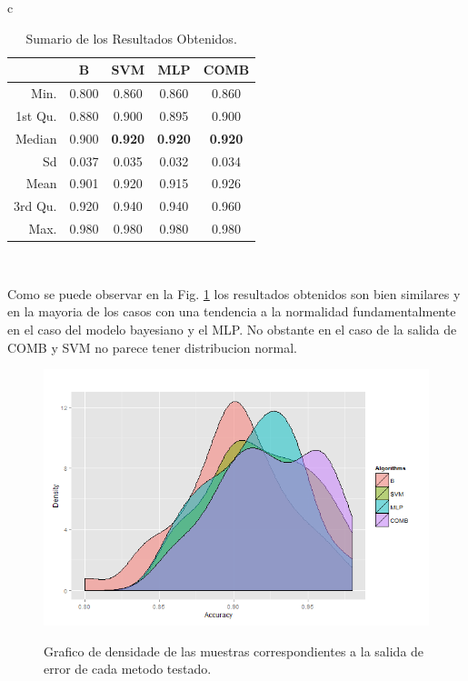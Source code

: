 \documentclass[12pt]{article}
\begin{document}
 
\begin{table}[!h]
\renewcommand{\arraystretch}{1.3}
\caption{Sumario de los Resultados Obtenidos. }
\label{tab:analisis_data}
\centering
\begin{tabular}{c}
\begin{tabular}{rcccc}
\hline
         &B   &     SVM  &  MLP   &  COMB     \\
\hline     
 Min.    &0.800   &0.860   &0.860   &0.860\\  
 1st Qu. &0.880   &0.900   &0.895   &0.900\\  
 Median  &0.900   &\textbf{0.920}   &\textbf{0.920}   &\textbf{0.920}\\  
 Sd      &0.037   &0.035   &0.032   &0.034\\
 Mean    &0.901   &0.920   &0.915   &0.926\\  
 3rd Qu. &0.920   &0.940   &0.940   &0.960\\  
 Max.    &0.980   &0.980   &0.980   &0.980\\  
\hline 
\end{tabular}\\
\end{tabular}
\end{table} 
 
Como se puede observar en la Fig. \ref{fig:densidade_acc} los resultados obtenidos son bien similares y en la mayoria de los casos con una tendencia a la normalidad fundamentalmente en el caso del modelo bayesiano y el MLP. No obstante en el caso de la salida de COMB y SVM no parece tener distribucion normal. 

\begin{figure}[h]
\centering
\includegraphics[width=4.5in]{../out/density-graph.png} \\
\caption{Grafico de densidade de las muestras correspondientes a la salida de error de cada metodo testado.}
\label{fig:densidade_acc}
\end{figure} 
\end{document}
